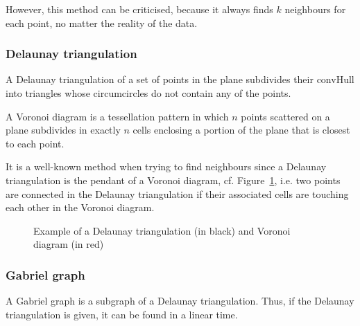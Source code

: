 \documentclass[lettersize,journal,english]{IEEEtran}
\begin{document}
However, this method can be criticised, because it always finds $k$ neighbours for each point, no matter the reality of the 
data.

\subsubsection{Delaunay triangulation}
A Delaunay triangulation \cite{art_delaunay} of a set of points in the plane subdivides their \gls{convHull} into triangles whose circumcircles 
do not contain any of the points.

A Voronoi diagram is a tessellation pattern in which $n$ points scattered on a plane subdivides in 
exactly $n$ cells enclosing a portion of the plane that is closest to each point. 

It is a well-known method when trying to find neighbours \cite{delaunay_neighbor}
since a Delaunay triangulation is the pendant of a Voronoi diagram, cf. Figure~\ref{fig:del_tri}, i.e. two points are connected in the
Delaunay triangulation if their associated cells are touching each other in the Voronoi diagram.

\begin{figure}[!b]
    \centering
    \caption{Example of a Delaunay triangulation (in black) and Voronoi diagram (in red)}
    \label{fig:del_tri}
\end{figure}

\subsubsection{Gabriel graph}
A Gabriel graph \cite{10.2307/2412323} is a subgraph of a Delaunay triangulation. Thus, if the Delaunay triangulation is given, it can be found in a linear time. 
\end{document}
